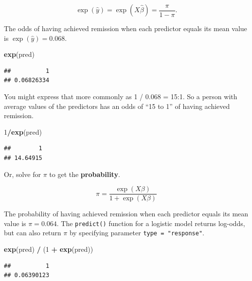 \documentclass[
]{book}
\newenvironment{Shaded}{\begin{snugshade}}{\end{snugshade}}
\newcommand{\DecValTok}[1]{\textcolor[rgb]{0.00,0.00,0.81}{#1}}
\newcommand{\KeywordTok}[1]{\textcolor[rgb]{0.13,0.29,0.53}{\textbf{#1}}}
\newcommand{\NormalTok}[1]{#1}
\newcommand{\OperatorTok}[1]{\textcolor[rgb]{0.81,0.36,0.00}{\textbf{#1}}}
\newcommand{\StringTok}[1]{\textcolor[rgb]{0.31,0.60,0.02}{#1}}
\begin{document}
\[\exp (\hat{y}) = \exp (X \hat{\beta}) = \frac{\pi}{1 - \pi}.\]

The odds of having achieved remission when each predictor equals its mean value is \(\exp(\hat{y}) = 0.068\).

\begin{Shaded}
\begin{Highlighting}[]
\KeywordTok{exp}\NormalTok{(pred)}
\end{Highlighting}
\end{Shaded}

\begin{verbatim}
##          1 
## 0.06826334
\end{verbatim}

You might express that more commonly as 1 / 0.068 = 15:1. So a person with average values of the predictors has an odds of ``15 to 1'' of having achieved remission.

\begin{Shaded}
\begin{Highlighting}[]
\DecValTok{1}\OperatorTok{/}\KeywordTok{exp}\NormalTok{(pred)}
\end{Highlighting}
\end{Shaded}

\begin{verbatim}
##        1 
## 14.64915
\end{verbatim}

Or, solve for \(\pi\) to get the \textbf{probability}.

\[\pi = \frac{\exp (X \beta)}{1 + \exp (X \beta)}\]

The probability of having achieved remission when each predictor equals its mean value is \(\pi = 0.064\). The \texttt{predict()} function for a logistic model returns log-odds, but can also return \(\pi\) by specifying parameter \texttt{type\ =\ "response"}.

\begin{Shaded}
\begin{Highlighting}[]
\KeywordTok{exp}\NormalTok{(pred) }\OperatorTok{/}\StringTok{ }\NormalTok{(}\DecValTok{1} \OperatorTok{+}\StringTok{ }\KeywordTok{exp}\NormalTok{(pred))}
\end{Highlighting}
\end{Shaded}

\begin{verbatim}
##          1 
## 0.06390123
\end{verbatim}
\end{document}
